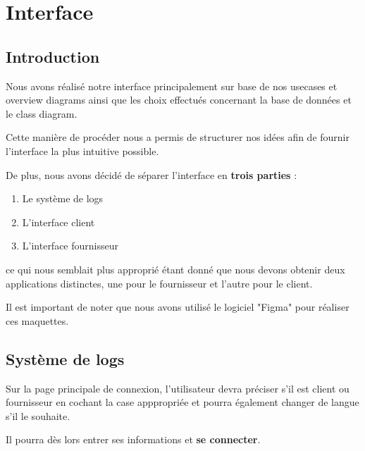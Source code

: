 \section{Interface}

\subsection{Introduction}

Nous avons réalisé notre interface principalement sur base de nos usecases et overview diagrams ainsi que les choix effectués concernant la base de données et le class diagram.

\begin{flushleft}
Cette manière de procéder nous a permis de structurer nos idées afin de fournir l'interface la plus intuitive possible.
\end{flushleft}

\begin{flushleft}
De plus, nous avons décidé de séparer l'interface en \textbf{trois parties} :
\end{flushleft}

\begin{enumerate}[1.]
\item Le système de logs
\item L'interface client
\item L'interface fournisseur
\end{enumerate}

\begin{flushleft}
ce qui nous semblait plus approprié étant donné que nous devons obtenir deux applications distinctes, une pour le fournisseur et l'autre pour le client.
\end{flushleft}

\begin{flushleft}
Il est important de noter que nous avons utilisé le logiciel "Figma" pour réaliser ces maquettes.
\end{flushleft}

\newpage
\subsection{Système de logs}
Sur la page principale de connexion, l'utilisateur devra préciser s'il est client ou fournisseur en cochant la case apppropriée et pourra également changer de langue s'il le souhaite.
\begin{flushleft}
Il pourra dès lors entrer ses informations et \textbf{se connecter}.
\end{flushleft}

